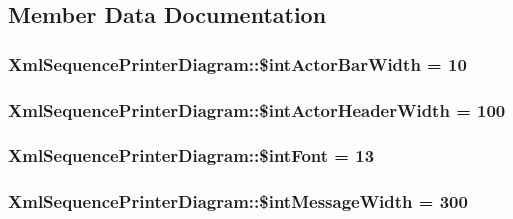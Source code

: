 \subsection{Member Data Documentation}
\hypertarget{class_xml_sequence_printer_diagram_97531ddc90690c05c0feecd57be48006}{
\subsubsection[{\$intActorBarWidth}]{\setlength{\rightskip}{0pt plus 5cm}XmlSequencePrinterDiagram::\$intActorBarWidth = 10}}
\label{class_xml_sequence_printer_diagram_97531ddc90690c05c0feecd57be48006}


\hypertarget{class_xml_sequence_printer_diagram_223b298c0d3af258bfe6a2631ae33ff5}{
\subsubsection[{\$intActorHeaderWidth}]{\setlength{\rightskip}{0pt plus 5cm}XmlSequencePrinterDiagram::\$intActorHeaderWidth = 100}}
\label{class_xml_sequence_printer_diagram_223b298c0d3af258bfe6a2631ae33ff5}


\hypertarget{class_xml_sequence_printer_diagram_dd52069aecd62faf2c555a4dec1ad607}{
\subsubsection[{\$intFont}]{\setlength{\rightskip}{0pt plus 5cm}XmlSequencePrinterDiagram::\$intFont = 13}}
\label{class_xml_sequence_printer_diagram_dd52069aecd62faf2c555a4dec1ad607}


\hypertarget{class_xml_sequence_printer_diagram_342c720d4dc17c2b8fd161f3f2579b3a}{
\subsubsection[{\$intMessageWidth}]{\setlength{\rightskip}{0pt plus 5cm}XmlSequencePrinterDiagram::\$intMessageWidth = 300}}
\label{class_xml_sequence_printer_diagram_342c720d4dc17c2b8fd161f3f2579b3a}


